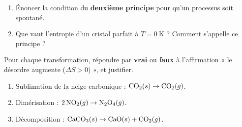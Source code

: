\documentclass[11pt,a4paper]{article}
\newcommand{\dS}{\Delta S}
\begin{document}
\begin{exercice}
\begin{enumerate}[label=\alph*),leftmargin=2em,topsep=2pt,itemsep=2pt]
  \item Énoncer la condition du \textbf{deuxième principe} pour qu'un processus soit spontané.
  \item Que vaut l'entropie d'un cristal parfait à $T=\SI{0}{\kelvin}$ ? Comment s'appelle ce principe ?
\end{enumerate}
\end{exercice}

\begin{exercice}
Pour chaque transformation, répondre par \textbf{vrai} ou \textbf{faux} à l'affirmation « le désordre
augmente ($\dS>0$) », et justifier.
\begin{enumerate}[label=\alph*),leftmargin=2em,topsep=2pt,itemsep=2pt]
  \item Sublimation de la neige carbonique : $\ce{CO2}(s) \rightarrow \ce{CO2}(g)$.
  \item Dimérisation : $2\,\ce{NO2}(g) \rightarrow \ce{N2O4}(g)$.
  \item Décomposition : $\ce{CaCO3}(s) \rightarrow \ce{CaO}(s) + \ce{CO2}(g)$.
\end{enumerate}
\end{exercice}
\end{document}

